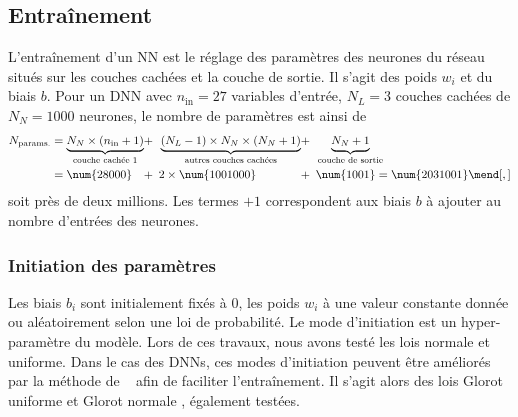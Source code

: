 \subsection{Entraînement}\label{chapter-ML-section-DNN-training}
L'entraînement d'un NN est le réglage des paramètres des neurones du réseau situés sur les couches cachées et la couche de sortie.
Il s'agit des poids $w_i$ et du biais $b$.
Pour un DNN avec
$n_\text{in} = \num{27}$ variables d'entrée,
$N_L = \num{3}$ couches cachées
de $N_N = \num{1000}$ neurones,
le nombre de paramètres est ainsi de
\begin{align}
N_\text{params.}
&= \underbrace{N_N \times (n_\text{in} + 1)}_\text{couche cachée 1} \!\!\!&\!\!\!+\,\,\,& \underbrace{(N_L -1)\times N_N \times(N_N+1)}_\text{autres couches cachées} \!\!\!&\!\!\!+\,\,\,& \underbrace{N_N +1\vphantom{()}}_\text{couche de sortie}
\nonumber\\&
=
\num{28000} \!\!\!&\!\!\!+\,\,\,& 2\times\num{1001000} \!\!\!&\!\!\!+\,\,\,& \num{1001}
=
\num{2031001}
\mend[,]
\end{align}
soit près de deux millions.
Les termes \og $+1$ \fg{} correspondent aux biais $b$ à ajouter au nombre d'entrées des neurones.
\subsubsection{Initiation des paramètres}
Les biais $b_i$ sont initialement fixés à 0,
les poids $w_i$ à une valeur constante donnée ou aléatoirement selon une loi de probabilité.
Le mode d'initiation est un hyper-paramètre du modèle.
Lors de ces travaux, nous avons testé les lois normale et uniforme.
Dans le cas des DNNs, ces modes d'initiation peuvent être améliorés par la méthode de \citeauthor{glorot}~\cite{glorot} afin de faciliter l'entraînement.
Il s'agit alors des lois \og Glorot uniforme \fg{} et \og Glorot normale \fg, également testées.
